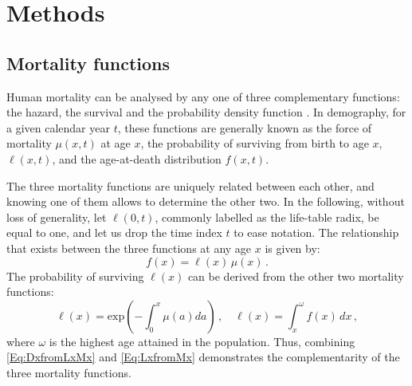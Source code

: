 \documentclass[Thesis]{subfiles}
\begin{document}
\section{Methods}\label{Sec:Ch4sec2}

\subsection{Mortality functions}\label{Subsec:Ch4subsec2.1}

Human mortality can be analysed by any one of three complementary functions: the hazard, the survival and the probability density function \citep{klein2003survival}. In demography, for a given calendar year $t$, these functions are generally known as the force of mortality $\mu(x,t)$ at age $x$, the probability of surviving from birth to age $x$, $\ell(x,t)$, and the age-at-death distribution $f(x,t)$. 

The three mortality functions are uniquely related between each other, and knowing one of them allows to determine the other two. In the following, without loss of generality, let $\ell(0, t)$, commonly labelled as the life-table radix, be equal to one, and let us drop the time index $t$ to ease notation. The relationship that exists between the three functions at any age $x$ is given by:
%
\begin{equation}\label{Eq:DxfromLxMx}
f(x)  = \ell(x)\,\mu(x)\,.
\end{equation}
%
The probability of surviving  $\ell(x)$ can be derived from the other two mortality functions:
%
\begin{equation}\label{Eq:LxfromMx}
\ell(x) = \mathrm{exp} \left(- \int_{0}^{x} \mu (a)da\right)\,, \quad \ell(x) = \int_{x}^{\omega} f(x)\,dx\,,
\end{equation}
%
where $\omega$ is the highest age attained in the population. Thus, combining \eqref{Eq:DxfromLxMx} and \eqref{Eq:LxfromMx} demonstrates the complementarity of the three mortality functions.
\end{document}
